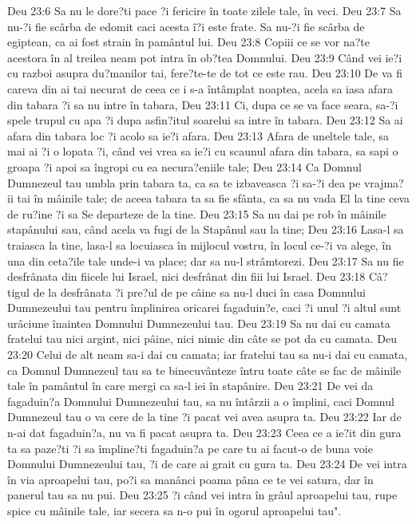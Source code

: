 Deu 23:6  Sa nu le dore?ti pace ?i fericire în toate zilele tale, în veci.
Deu 23:7  Sa nu-?i fie scârba de edomit caci acesta î?i este frate. Sa nu-?i fie scârba de egiptean, ca ai fost strain în pamântul lui.
Deu 23:8  Copiii ce se vor na?te acestora în al treilea neam pot intra în ob?tea Domnului.
Deu 23:9  Când vei ie?i cu razboi asupra du?manilor tai, fere?te-te de tot ce este rau.
Deu 23:10  De va fi careva din ai tai necurat de ceea ce i s-a întâmplat noaptea, acela sa iasa afara din tabara ?i sa nu intre în tabara,
Deu 23:11  Ci, dupa ce se va face seara, sa-?i spele trupul cu apa ?i dupa asfin?itul soarelui sa intre în tabara.
Deu 23:12  Sa ai afara din tabara loc ?i acolo sa ie?i afara.
Deu 23:13  Afara de uneltele tale, sa mai ai ?i o lopata ?i, când vei vrea sa ie?i cu scaunul afara din tabara, sa sapi o groapa ?i apoi sa îngropi cu ea necura?eniile tale;
Deu 23:14  Ca Domnul Dumnezeul tau umbla prin tabara ta, ca sa te izbaveasca ?i sa-?i dea pe vrajma?ii tai în mâinile tale; de aceea tabara ta sa fie sfânta, ca sa nu vada El la tine ceva de ru?ine ?i sa Se departeze de la tine.
Deu 23:15  Sa nu dai pe rob în mâinile stapânului sau, când acela va fugi de la Stapânul sau la tine;
Deu 23:16  Lasa-l sa traiasca la tine, lasa-l sa locuiasca în mijlocul vostru, în locul ce-?i va alege, în una din ceta?ile tale unde-i va place; dar sa nu-l strâmtorezi.
Deu 23:17  Sa nu fie desfrânata din fiicele lui Israel, nici desfrânat din fiii lui Israel.
Deu 23:18  Câ?tigul de la desfrânata ?i pre?ul de pe câine sa nu-l duci în casa Domnului Dumnezeului tau pentru împlinirea oricarei fagaduin?e, caci ?i unul ?i altul sunt urâciune înaintea Domnului Dumnezeului tau.
Deu 23:19  Sa nu dai cu camata fratelui tau nici argint, nici pâine, nici nimic din câte se pot da cu camata.
Deu 23:20  Celui de alt neam sa-i dai cu camata; iar fratelui tau sa nu-i dai cu camata, ca Domnul Dumnezeul tau sa te binecuvânteze întru toate câte se fac de mâinile tale în pamântul în care mergi ca sa-l iei în stapânire.
Deu 23:21  De vei da fagaduin?a Domnului Dumnezeului tau, sa nu întârzii a o împlini, caci Domnul Dumnezeul tau o va cere de la tine ?i pacat vei avea asupra ta.
Deu 23:22  Iar de n-ai dat fagaduin?a, nu va fi pacat asupra ta.
Deu 23:23  Ceea ce a ie?it din gura ta sa paze?ti ?i sa împline?ti fagaduin?a pe care tu ai facut-o de buna voie Domnului Dumnezeului tau, ?i de care ai grait cu gura ta.
Deu 23:24  De vei intra în via aproapelui tau, po?i sa manânci poama pâna ce te vei satura, dar în panerul tau sa nu pui.
Deu 23:25  ?i când vei intra în grâul aproapelui tau, rupe spice cu mâinile tale, iar secera sa n-o pui în ogorul aproapelui tau".
